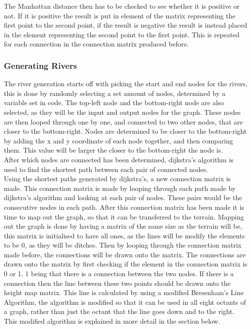 	The Manhattan distance then has to be checked to see whether it is positive or not. If it is positive the result is put in element of the matrix representing the first point to the second point, if the result is negative the result is instead placed in the element representing the second point to the first point. This is repeated for each connection in the connection matrix produced before.

\subsubsection{Generating Rivers}
	The river generation starts off with picking the start and end nodes for the rivers, this is done by randomly selecting a set amount of nodes, determined by a variable set in code. The top-left node and the bottom-right node are also selected, as they will be the input and output nodes for the graph. These nodes are then looped through one by one, and connected to two other nodes, that are closer to the bottom-right. Nodes are determined to be closer to the bottom-right by adding the x and y coordinate of each node together, and then comparing them. This value will be larger the closer to the bottom-right the node is.\\

	After which nodes are connected has been determined, dijkstra's algorithm is used to find the shortest path between each pair of connected nodes.\\


	Using the shortest paths generated by dijkstra's, a new connection matrix is made. This connection matrix is made by looping through each path made by dijkstra's algorithm and looking at each pair of nodes. These pairs would be the consecutive nodes in each path. After this connection matrix has been made it is time to map out the graph, so that it can be transferred to the terrain. Mapping out the graph is done by having a matrix of the same size as the terrain will be, this matrix is initialised to have all ones, as the lines will be modify the elements to be 0, as they will be ditches. Then by looping through the connection matrix made before, the connections will be drawn onto the matrix. The connections are drawn onto the matrix by first checking if the element in the connection matrix is 0 or 1, 1 being that there is a connection between the two nodes. If there is a connection then the line between these two points should be drawn onto the height map matrix. This line is calculated by using a modified Bresenham's Line Algorithm, the algorithm is modified so that it can be used in all eight octants of a graph, rather than just the octant that the line goes down and to the right. This modified algorithm is explained in more detail in the section below.

